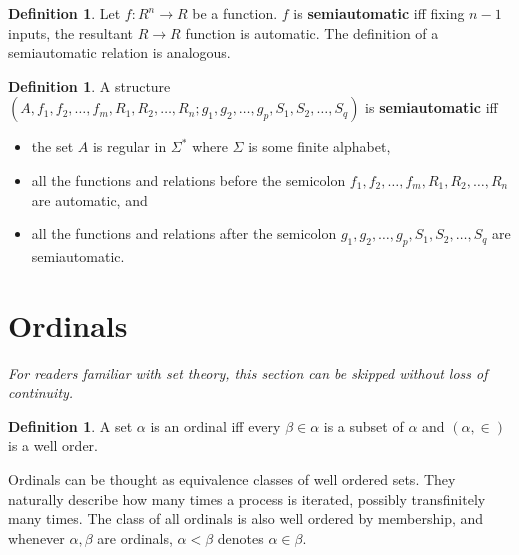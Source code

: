 \documentclass[british,a4paper,11pt,abstract=on]{scrreprt}
\theoremstyle{definition}
\newtheorem{definition}[theorem]{Definition}
\theoremstyle{remark}
\begin{document}
\begin{definition}
    Let \(f: R^n \to R\) be a function.
    \(f\) is \textbf{semiautomatic} iff fixing \(n-1\) inputs, the resultant \(R\to R\) function is automatic.
    The definition of a semiautomatic relation is analogous.
\end{definition}
\begin{definition}
    A structure \((A, f_1, f_2, \dots, f_m, R_1, R_2, \dots, R_n; g_1, g_2, \dots, g_p, S_1, S_2, \dots, S_q)\) is \textbf{semiautomatic} iff
    \begin{itemize}
        \item the set \(A\) is regular in \(\Sigma^*\) where \(\Sigma\) is some finite alphabet,
        \item all the functions and relations before the semicolon \(f_1, f_2, \dots, f_m, R_1, R_2, \dots, R_n\) are automatic, and
        \item all the functions and relations after the semicolon \(g_1, g_2, \dots, g_p, S_1, S_2, \dots, S_q\) are semiautomatic.
    \end{itemize}
\end{definition}



\section{Ordinals}

\emph{For readers familiar with set theory, this section can be skipped without loss of continuity.}

\begin{definition}
    A set \(\alpha\) is an ordinal iff every \(\beta\in\alpha\) is a subset of \(\alpha\) and \((\alpha,\in)\) is a well order.
\end{definition}

Ordinals can be thought as equivalence classes of well ordered sets.
They naturally describe how many times a process is iterated, possibly transfinitely many times.
The class of all ordinals is also well ordered by membership,
and whenever \(\alpha,\beta\) are ordinals, \(\alpha < \beta\) denotes \(\alpha \in \beta\).
\end{document}
